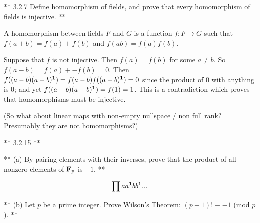 ** 3.2.7 Define homomorphism of fields, and prove that every homomorphism of
fields is injective. **

A homomorphism between fields $F$ and $G$ is a function $f: F \rightarrow G$
such that $f(a+b) = f(a) + f(b)$ and $f(ab) = f(a)f(b)$.

Suppose that $f$ is not injective. Then $f(a) = f(b)$ for some $a \neq b$. So
$f(a-b) = f(a) + -f(b) = 0$. Then $f((a-b)(a-b)^{\mathbf 1}) = f(a-b)f((a-b)^{\mathbf 1}) = 0$
since the product of $0$ with anything is $0$; and yet $f((a-b)(a-b)^{\mathbf 1}) = f(1)
= 1$. This is a contradiction which proves that homomorphisms must be
injective.

(So what about linear maps with non-empty nullspace / non full rank? Presumably
they are not homomorphisms?)

** 3.2.15 **

** (a) By pairing elements with their inverses, prove that the product of all
nonzero elements of $\mathbf{F}_p$ is $-1$. **

\begin{align*}
\prod aa^{\mathbf 1} bb^{\mathbf 1} ...
\end{align*}

** (b) Let $p$ be a prime integer. Prove Wilson's Theorem: $(p- 1)! \equiv -1$ (mod $p$). **
